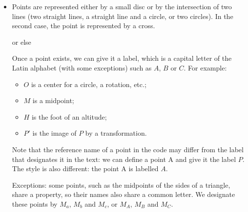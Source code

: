 \begin{itemize}
\item Points are represented either by a small disc or by the intersection of two lines (two straight lines, a straight line and a circle, or two circles). In the second case, the point is represented by a cross.

\begin{tkzexample}[latex=6cm, small]     
\end{tkzexample}

or else

\begin{tkzexample}[latex=6cm, small]     
    \end{tkzexample}  

Once a point exists, we can give it a label, which is a capital letter of the Latin alphabet (with some exceptions) such as $A$, $B$ or $C$. For example:
\begin{itemize}
\item $O$ is a center for a circle, a rotation, etc.;
\item $M$ is a midpoint;
\item $H$ is the foot of an altitude;
\item $P'$ is the image of $P$ by a transformation.
\end{itemize}

Note that the reference name of a point in the code may differ from the label that designates it in the text: we can define a point A and give it the label $P$. The style is also different: the point A is labelled $A$.

\begin{tkzexample}[latex=6cm, small]     
\end{tkzexample}

Exceptions: some points, such as the midpoints of the sides of a triangle, share a property, so their names also share a common letter. We designate these points by $M_a$, $M_b$ and $M_c$, or $M_A$, $M_B$ and $M_C$.


\end{itemize}
